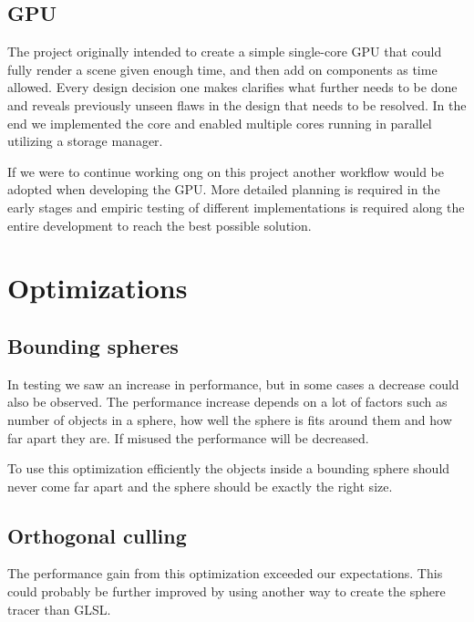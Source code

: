		\subsection{GPU} 
		
			The project originally intended to create a simple single-core GPU
			that could fully render a scene given enough time, and then add on
			components as time allowed. Every design decision one makes
			clarifies what further needs to be done and reveals previously
			unseen flaws in the design that needs to be resolved. In the end we
			implemented the core and enabled multiple cores running in parallel
			utilizing a storage manager.  
			
            If we were to continue working ong on this project another workflow
            would be adopted when developing the GPU. More detailed planning is
            required in the early stages and empiric testing of different
            implementations is required along the entire development to reach
            the best possible solution.

	\section{Optimizations} \label{optimization}

		\subsection{Bounding spheres}

			In testing we saw an increase in performance, but in some cases 
			a decrease could also be observed. The performance increase depends 
			on a lot of factors such as number of objects in a sphere, how well 
			the sphere is fits around them and how far apart they are. If misused
			the performance will be decreased.

			To use this optimization efficiently the objects inside a bounding
			sphere should never come far apart and the sphere should be exactly
			the right size.

		\subsection{Orthogonal culling}

			The performance gain from this optimization exceeded our
			expectations. This could probably be further improved by using
			another way to create the sphere tracer than GLSL. 

